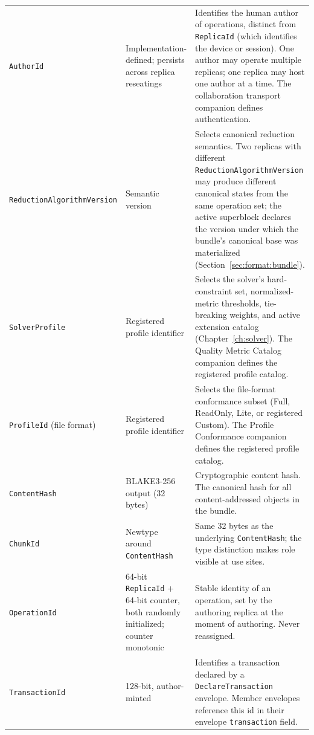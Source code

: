 \documentclass[11pt,letterpaper]{report}
\begin{document}
\begin{longtable}{p{3.4cm} p{3.6cm} p{6.6cm}}
  \texttt{AuthorId} &
  Implementation-defined; persists across replica reseatings &
  Identifies the human author of operations, distinct from
  \texttt{ReplicaId} (which identifies the device or session).
  One author may operate multiple replicas; one replica may host
  one author at a time. The collaboration transport companion
  defines authentication. \\

  \texttt{ReductionAlgorithmVersion} &
  Semantic version &
  Selects canonical reduction semantics. Two replicas with
  different \texttt{ReductionAlgorithmVersion} may produce
  different canonical states from the same operation set; the
  active superblock declares the version under which the
  bundle's canonical base was materialized
  (Section~\ref{sec:format:bundle}). \\

  \texttt{SolverProfile} &
  Registered profile identifier &
  Selects the solver's hard-constraint set, normalized-metric
  thresholds, tie-breaking weights, and active extension
  catalog (Chapter~\ref{ch:solver}). The Quality Metric Catalog
  companion defines the registered profile catalog. \\

  \texttt{ProfileId} (file format) &
  Registered profile identifier &
  Selects the file-format conformance subset (Full, ReadOnly,
  Lite, or registered Custom). The Profile Conformance companion
  defines the registered profile catalog. \\

  \texttt{ContentHash} &
  BLAKE3-256 output (32 bytes) &
  Cryptographic content hash. The canonical hash for all
  content-addressed objects in the bundle. \\

  \texttt{ChunkId} &
  Newtype around \texttt{ContentHash} &
  Same 32 bytes as the underlying \texttt{ContentHash}; the
  type distinction makes role visible at use sites. \\

  \texttt{OperationId} &
  64-bit \texttt{ReplicaId} + 64-bit counter, both
  randomly initialized; counter monotonic &
  Stable identity of an operation, set by the authoring replica
  at the moment of authoring. Never reassigned. \\

  \texttt{TransactionId} &
  128-bit, author-minted &
  Identifies a transaction declared by a
  \texttt{DeclareTransaction} envelope. Member envelopes
  reference this id in their envelope \texttt{transaction}
  field. \\


\end{longtable}
\end{document}
